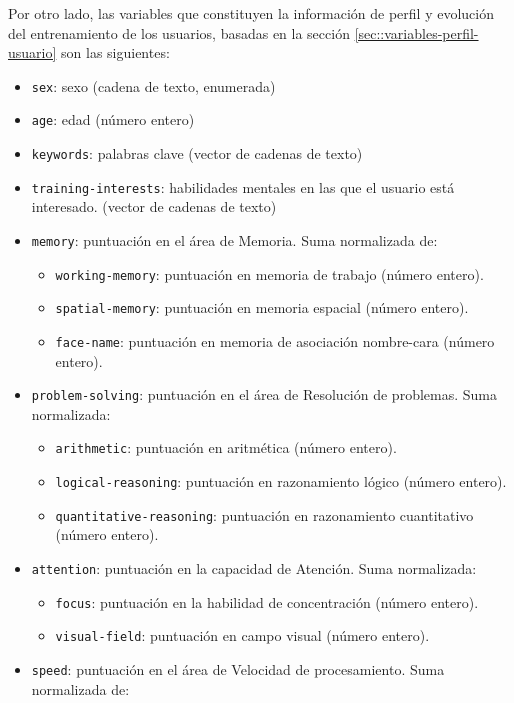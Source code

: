 Por otro lado, las variables que constituyen la información de perfil y evolución del entrenamiento de los usuarios, basadas en la sección \ref{sec::variables-perfil-usuario} son las siguientes:

\begin{itemize}
\item {\tt sex}: sexo (cadena de texto, enumerada)
\item {\tt age}: edad (número entero)
\item {\tt keywords}: palabras clave (vector de cadenas de texto)
\item {\tt training-interests}: habilidades mentales en las que el usuario está interesado. (vector de cadenas de texto)
\item {\tt memory}: puntuación en el área de Memoria. Suma normalizada de:
  \begin{itemize}
  \item {\tt working-memory}: puntuación en memoria de trabajo (número entero).
  \item {\tt spatial-memory}: puntuación en memoria espacial (número entero).
  \item {\tt face-name}: puntuación en memoria de asociación nombre-cara (número entero).
  \end{itemize}
\item {\tt problem-solving}: puntuación en el área de Resolución de problemas. Suma normalizada:
  \begin{itemize}
  \item {\tt arithmetic}: puntuación en aritmética (número entero).
  \item {\tt logical-reasoning}: puntuación en razonamiento lógico (número entero).
  \item {\tt quantitative-reasoning}: puntuación en razonamiento cuantitativo (número entero).
  \end{itemize}
\item {\tt attention}: puntuación en la capacidad de Atención. Suma normalizada:
  \begin{itemize}
  \item {\tt focus}: puntuación en la habilidad de concentración (número entero).
  \item {\tt visual-field}: puntuación en campo visual (número entero).
  \end{itemize}
\item {\tt speed}: puntuación en el área de Velocidad de procesamiento. Suma normalizada de:
  \begin{itemize}

\end{itemize}
\end{itemize}
